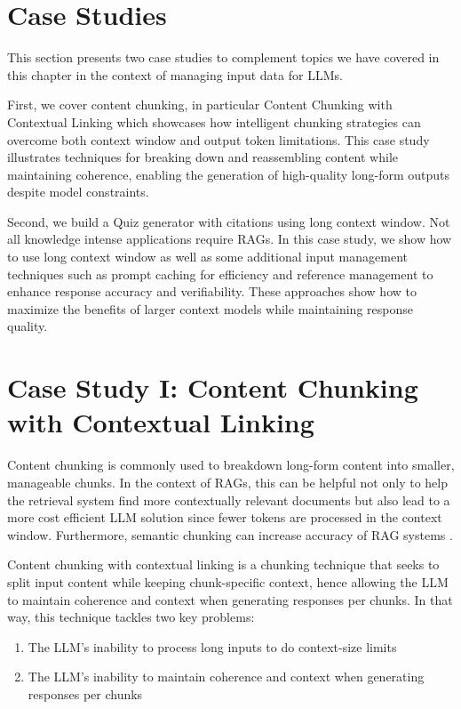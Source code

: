 \section{Case Studies}

This section presents two case studies to complement topics we have covered in this chapter in the context of managing input data for LLMs.

First, we cover content chunking, in particular Content Chunking with Contextual Linking which showcases how intelligent chunking strategies can overcome both context window and output token limitations. This case study illustrates techniques for breaking down and reassembling content while maintaining coherence, enabling the generation of high-quality long-form outputs despite model constraints.

Second, we build a Quiz generator with citations using long context window. Not all knowledge intense applications require RAGs. In this case study, we show how to use long context window as well as some additional input management techniques such as prompt caching for efficiency and reference management to enhance response accuracy and verifiability. These approaches show how to maximize the benefits of larger context models while maintaining response quality.

\section{Case Study I: Content Chunking with Contextual Linking}
\label{chunking}
Content chunking is commonly used to breakdown long-form content into smaller, manageable chunks. In the context of RAGs, this can be helpful not only to help the retrieval system find more contextually relevant documents but also lead to a more cost efficient LLM solution since fewer tokens are processed in the context window. Furthermore, semantic chunking can increase accuracy of RAG systems .

Content chunking with contextual linking is a chunking technique that seeks to split input content while keeping chunk-specific context, hence allowing the LLM to maintain coherence and context when generating responses per chunks. In that way, this technique tackles two key problems:
\begin{enumerate}
\item The LLM's inability to process long inputs to do context-size limits
\item The LLM's inability to maintain coherence and context when generating responses per chunks
\end{enumerate}

